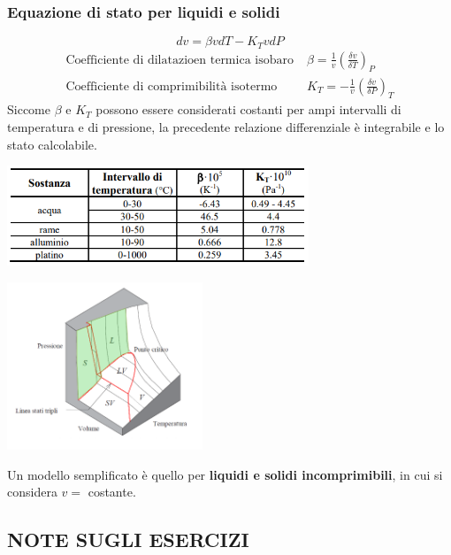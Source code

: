 \subsubsection{Equazione di stato per liquidi e solidi}
\[
    dv = \beta v dT - K_T v dP
\]
\[
    \begin{matrix}
        \text{Coefficiente di dilatazioen termica isobaro}\; & \beta = \frac{1}{v}\left(\frac{\delta v}{\delta T}\right)_P\\
        \text{Coefficiente di comprimibilità isotermo}\; & K_T = - \frac{1}{v}\left( \frac{\delta v}{ \delta P} \right)_T
    \end{matrix}
\]
Siccome $\beta$ e $K_T$ possono essere considerati costanti per ampi intervalli di temperatura e di pressione, la precedente relazione differenziale è integrabile e lo stato calcolabile.
\begin{center}
    \includegraphics[height=3cm]{../L01/img9.PNG}
\end{center}
\begin{center}
    \includegraphics[height=5cm]{../L01/img7.PNG}
\end{center}
Un modello semplificato è quello per \textbf{liquidi e solidi incomprimibili}, in cui si considera $v =$ costante.
\subsection{NOTE SUGLI ESERCIZI}